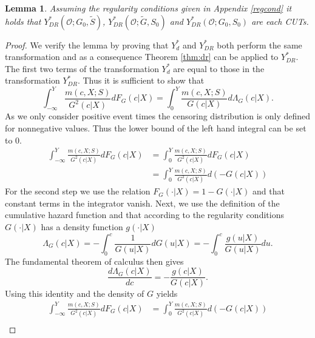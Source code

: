\documentclass[12pt, a4paper]{scrartcl}
\theoremstyle{definition}
\theoremstyle{plain}
\newtheorem{Lemma}{Lemma}[section]
\numberwithin{equation}{section}
\numberwithin{figure}{section}
\numberwithin{table}{section}
\begin{document}
	\begin{Lemma}
		Assuming the regularity conditions given in Appendix \ref{regcond} it holds that $Y_{DR}^*(\mathcal{O}; G_0, \tilde{S})$, $Y_{DR}^*(\mathcal{O}; \tilde{G}, S_0)$ and $Y_{DR}^*(\mathcal{O}; G_0, S_0)$ are each CUTs.
	\end{Lemma}
	\begin{proof}
		We verify the lemma by proving that $Y_d^*$ and $Y_{DR}^*$ both perform the same transformation and as a consequence Theorem \ref{thm:dr} can be applied to $Y_{DR}^*$.
		The first two terms of the transformation $Y_d^*$ are equal to those in the transformation $Y_{DR}^*$.
		Thus it is sufficient to show that
		\begin{equation*}
		\int_{-\infty}^{Y}\frac{m(c,X;S)}{G^2(c\vert X)}dF_G(c\vert X) = \int_{0}^{Y} \frac{m(c,X;S)}{G(c \vert X)} d\Lambda_G(c \vert X).
		\end{equation*}
		As we only consider positive event times the censoring distribution is only defined for nonnegative values.
		Thus the lower bound of the left hand integral can be set to 0.
		\begin{equation*}
		\begin{split}
		\int_{-\infty}^{Y}\frac{m(c,X;S)}{G^2(c\vert X)}dF_G(c\vert X) &={} \int_{0}^{Y}\frac{m(c,X;S)}{G^2(c\vert X)}dF_G(c\vert X)\\
		&={} \int_{0}^{Y}\frac{m(c,X;S)}{G^2(c\vert X)}d(-G(c\vert X))
		\end{split}
		\end{equation*}
		For the second step we use the relation $F_G(\cdot\vert X)= 1-G(\cdot\vert X)$ and that constant terms in the integrator vanish.
		Next, we use the definition of the cumulative hazard function and that according to the regularity conditions $G(\cdot \vert X)$ has a density function $g(\cdot \vert X)$
		\begin{equation*}
			\Lambda_G(c \vert X) = - \int_{0}^{c}\frac{1}{G(u\vert X)}dG(u\vert X) = - \int_{0}^{c}\frac{g(u\vert X)}{G(u\vert X)}du.
		\end{equation*}
		The fundamental theorem of calculus then gives
		\begin{equation*}
		\frac{d\Lambda_G(c \vert X)}{dc} = -\frac{g(c\vert X)}{G(c\vert X)}.
		\end{equation*}
		Using this identity and the density of $G$ yields
		\begin{equation*}
		\begin{split}
		\int_{-\infty}^{Y}\frac{m(c,X;S)}{G^2(c\vert X)}dF_G(c\vert X) &={} \int_{0}^{Y}\frac{m(c,X;S)}{G^2(c\vert X)}d(-G(c\vert X))\\

\end{split}
\end{equation*}
\end{proof}
\end{document}
